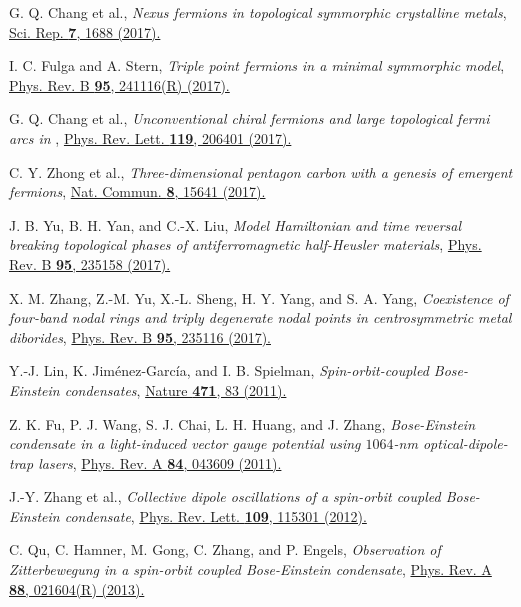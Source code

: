 \documentclass[aps,prl,floatfix,twocolumn,reprint]{revtex4}
\begin{document}
\begin{thebibliography}{99}
 G. Q. Chang et al., \textit{Nexus fermions in topological
symmorphic crystalline metals}, \href{https://doi.org/10.1038/s41598-017-01523-8}%
{Sci. Rep. \textbf{7}, 1688 (2017).}

 I. C. Fulga and A. Stern, \textit{Triple point fermions in a
minimal symmorphic model}, \href{https://doi.org/10.1103/PhysRevB.95.241116}{%
Phys. Rev. B \textbf{95}, 241116(R) (2017).}

 G. Q. Chang et al., \textit{Unconventional chiral fermions and large topological fermi arcs in }, \href{https://doi.org/10.1103/PhysRevLett.119.206401}
{Phys. Rev. Lett. {\bf{119}}, 206401 (2017).}

 C. Y. Zhong et al., \textit{Three-dimensional pentagon carbon
with a genesis of emergent fermions}, \href{https://doi.org/10.1038/ncomms15641}%
{Nat. Commun. \textbf{8}, 15641 (2017).}

 J. B. Yu, B. H. Yan, and C.-X. Liu, \textit{Model Hamiltonian
and time reversal breaking topological phases of antiferromagnetic
half-Heusler materials}, \href{https://doi.org/10.1103/PhysRevB.95.235158}{%
Phys. Rev. B \textbf{95}, 235158 (2017).}

 X. M. Zhang, Z.-M. Yu, X.-L. Sheng, H. Y. Yang, and S. A.
Yang, \textit{Coexistence of four-band nodal rings and triply degenerate
nodal points in centrosymmetric metal diborides}, \href{https://doi.org/10.1103/PhysRevB.95.235116}%
{Phys. Rev. B {\textbf{95}}, 235116 (2017).}

 Y.-J. Lin, K. Jim{\'e}nez-Garc{\'i}a, and I. B. Spielman,
\textit{Spin-orbit-coupled Bose-Einstein condensates}, \href{https://doi.org/10.1038/nature09887}%
{Nature \textbf{471}, 83 (2011).}

 Z. K. Fu, P. J. Wang, S. J. Chai, L. H. Huang, and J.
Zhang, \textit{Bose-Einstein condensate in a light-induced vector gauge
potential using $1064$-nm optical-dipole-trap lasers}, \href{https://doi.org/10.1103/PhysRevA.84.043609}%
{Phys. Rev. A \textbf{84}, 043609 (2011).}

 J.-Y. Zhang et al., \textit{Collective dipole oscillations
of a spin-orbit coupled Bose-Einstein condensate}, \href{https://doi.org/10.1103/PhysRevLett.109.115301}%
{Phys. Rev. Lett. \textbf{109}, 115301 (2012).}

 C. Qu, C. Hamner, M. Gong, C. Zhang, and P. Engels, \textit{%
Observation of Zitterbewegung in a spin-orbit coupled Bose-Einstein
condensate}, \href{https://doi.org/10.1103/PhysRevA.88.021604}{Phys. Rev. A
\textbf{88}, 021604(R) (2013).}


\end{thebibliography}
\end{document}
